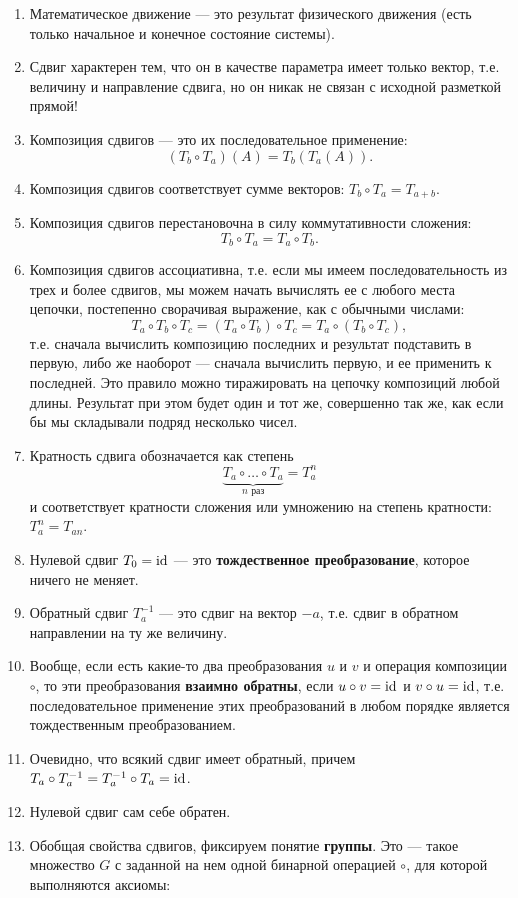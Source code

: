 \begin{enumerate}
\item Математическое движение --- это результат физического движения (есть только начальное и конечное состояние системы).
\item Сдвиг характерен тем, что он в качестве параметра имеет только вектор, т.е. величину и направление сдвига, но он никак не связан с исходной разметкой прямой!
\item Композиция сдвигов --- это их последовательное применение: $$(T_b\circ T_a)(A)=T_b(T_a(A)).$$
\item Композиция сдвигов соответствует сумме векторов: $T_b\circ T_a=T_{a+b}$.
\item Композиция сдвигов перестановочна в силу коммутативности сложения: $$T_b\circ T_a=T_a\circ T_b.$$
\item Композиция сдвигов ассоциативна, т.е. если мы имеем последовательность из трех и более сдвигов, мы можем начать вычислять ее с любого места цепочки, постепенно сворачивая выражение, как с обычными числами:
$$
T_a\circ T_b\circ T_c = (T_a\circ T_b)\circ T_c = T_a\circ (T_b\circ T_c),
$$
т.е. сначала вычислить композицию последних и результат подставить в первую, либо же наоборот --- сначала вычислить первую, и ее применить к последней. Это правило можно тиражировать на цепочку композиций любой длины. Результат при этом будет один и тот же, совершенно так же, как если бы мы складывали подряд несколько чисел.
\item Кратность сдвига обозначается как степень
$$
\underbrace{T_a\circ\dots\circ T_a}_{n\mbox{ раз}}=T_a^n
$$
и соответствует кратности сложения или умножению на степень кратности: $T_a^n=T_{an}$.
\item Нулевой сдвиг $T_0=\mathrm{id}$ --- это \textbf{тождественное преобразование}, которое ничего не меняет.
\item Обратный сдвиг $T_a^{-1}$ --- это сдвиг на вектор $-a$, т.е. сдвиг в обратном направлении на ту же величину.
\item Вообще, если есть какие-то два преобразования $u$ и $v$ и операция композиции $\circ$, то эти преобразования \textbf{взаимно обратны}, если $u\circ v=\mathrm{id}$ и $v\circ u=\mathrm{id}$, т.е. последовательное применение этих преобразований в любом порядке является тождественным преобразованием.
\item Очевидно, что всякий сдвиг имеет обратный, причем $T_a\circ T_a^{-1}=T_a^{-1}\circ T_a=\mathrm{id}$.
\item Нулевой сдвиг сам себе обратен.
\item Обобщая свойства сдвигов, фиксируем понятие \textbf{группы}. Это --- такое множество $G$ с заданной на нем одной бинарной операцией $\circ$, для которой выполняются аксиомы:

\end{enumerate}
